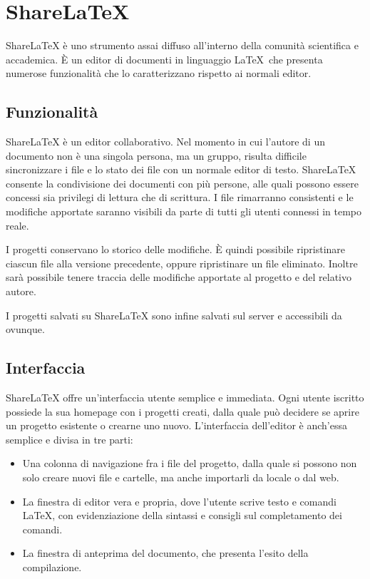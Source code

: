\chapter{ShareLaTeX}
\label{ShareLaTeX}
\thispagestyle{empty}

ShareLaTeX è uno strumento assai diffuso all'interno della comunità scientifica e accademica. È un editor di documenti in linguaggio \LaTeX ~che presenta numerose funzionalità che lo caratterizzano rispetto ai normali editor.

\section{Funzionalità}
ShareLaTeX è un editor collaborativo. Nel momento in cui l'autore di un documento non è una singola persona, ma un gruppo, risulta difficile sincronizzare i file e lo stato dei file con un normale editor di testo. ShareLaTeX consente la condivisione dei documenti con più persone, alle quali possono essere concessi sia privilegi di lettura che di scrittura. I file rimarranno consistenti e le modifiche apportate saranno visibili da parte di tutti gli utenti connessi in tempo reale.

I progetti conservano lo storico delle modifiche. È quindi possibile ripristinare ciascun file alla versione precedente, oppure ripristinare un file eliminato. Inoltre sarà possibile tenere traccia delle modifiche apportate al progetto e del relativo autore.

I progetti salvati su ShareLaTeX sono infine salvati sul server e accessibili da ovunque.

\section{Interfaccia}
ShareLaTeX offre un'interfaccia utente semplice e immediata. Ogni utente iscritto possiede la sua homepage con i progetti creati, dalla quale può decidere se aprire un progetto esistente o crearne uno nuovo. L'interfaccia dell'editor è anch'essa semplice e divisa in tre parti:
\begin{itemize}
    \item Una colonna di navigazione fra i file del progetto, dalla quale si possono non solo creare nuovi file e cartelle, ma anche importarli da locale o dal web.
    \item La finestra di editor vera e propria, dove l'utente scrive testo e comandi \LaTeX, con evidenziazione della sintassi e consigli sul completamento dei comandi.
    \item La finestra di anteprima del documento, che presenta l'esito della compilazione.
\end{itemize}

